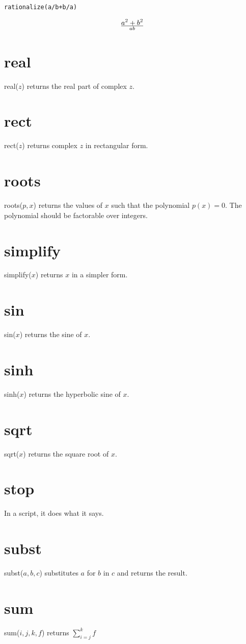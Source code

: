 \documentclass[11pt]{article}
\begin{document}
\medskip
{\tt rationalize(a/b+b/a)}

$$a^2+b^2\over ab$$

\section*{real}
real($z$) returns the real part of complex $z$.

\section*{rect}
rect($z$) returns complex $z$ in rectangular form.

\section*{roots}
roots($p,x$) returns the values of $x$ such that the polynomial $p(x)=0$.
The polynomial should be factorable over integers.

\section*{simplify}
simplify($x$) returns $x$ in a simpler form.

\section*{sin}
sin($x$) returns the sine of $x$.

\section*{sinh}
sinh($x$) returns the hyperbolic sine of $x$.

\section*{sqrt}
sqrt($x$) returns the square root of $x$.

\section*{stop}
In a script, it does what it says.

\section*{subst}
subst($a,b,c$) substitutes $a$ for $b$ in $c$ and returns the result.

\section*{sum}
sum($i,j,k,f$) returns $\displaystyle\sum_{i=j}^k f$
\end{document}
